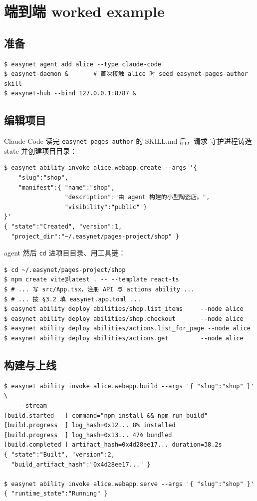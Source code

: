 \documentclass[11pt,a4paper]{article}
\theoremstyle{definition}
\begin{document}
\section{端到端 worked example}
\label{sec:e2e}

\subsection{准备}

\begin{lstlisting}
$ easynet agent add alice --type claude-code
$ easynet-daemon &       # 首次接触 alice 时 seed easynet-pages-author skill
$ easynet-hub --bind 127.0.0.1:8787 &
\end{lstlisting}

\subsection{编辑项目}

Claude Code 读完 \texttt{easynet-pages-author} 的 SKILL.md 后，请求
守护进程铸造 state 并创建项目目录：

\begin{lstlisting}
$ easynet ability invoke alice.webapp.create --args '{
    "slug":"shop",
    "manifest":{ "name":"shop",
                 "description":"由 agent 构建的小型陶瓷店。",
                 "visibility":"public" }
}'
{ "state":"Created", "version":1,
  "project_dir":"~/.easynet/pages-project/shop" }
\end{lstlisting}

\noindent agent 然后 \texttt{cd} 进项目目录、用工具链：

\begin{lstlisting}
$ cd ~/.easynet/pages-project/shop
$ npm create vite@latest . -- --template react-ts
$ # ... 写 src/App.tsx，注册 API 与 actions ability ...
$ # ... 按 §3.2 填 easynet.app.toml ...
$ easynet ability deploy abilities/shop.list_items     --node alice
$ easynet ability deploy abilities/shop.checkout       --node alice
$ easynet ability deploy abilities/actions.list_for_page --node alice
$ easynet ability deploy abilities/actions.get         --node alice
\end{lstlisting}

\subsection{构建与上线}

\begin{lstlisting}
$ easynet ability invoke alice.webapp.build --args '{ "slug":"shop" }' \
    --stream
[build.started   ] command="npm install && npm run build"
[build.progress  ] log_hash=0x12... 8% installed
[build.progress  ] log_hash=0x13... 47% bundled
[build.completed ] artifact_hash=0x4d28ee17... duration=38.2s
{ "state":"Built", "version":2,
  "build_artifact_hash":"0x4d28ee17..." }

$ easynet ability invoke alice.webapp.serve --args '{ "slug":"shop" }'
{ "runtime_state":"Running" }
\end{lstlisting}
\end{document}

